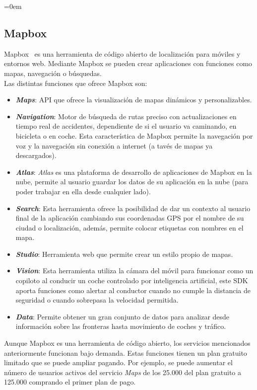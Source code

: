 \parindent=0em
\subsection{Mapbox}
\noindent

Mapbox~\cite{mapboxMainPage} es una herramienta de código abierto de localización para móviles y entornos web. Mediante Mapbox se pueden crear aplicaciones con funciones como mapas, navegación o búsquedas.\\

Las distintas funciones que ofrece Mapbox son:

\begin{itemize}
    \item \textit{\textbf{Maps}}: API que ofrece la visualización de mapas dinámicos y personalizables.
    
    \item \textit{\textbf{Navigation}}: Motor de búsqueda de rutas preciso con actualizaciones en tiempo real de accidentes, dependiente de si el usuario va caminando, en bicicleta o en coche. Esta característica de Mapbox permite la navegación por voz y la navegación sin conexión a internet (a tavés de mapas ya descargados).

    \item \textit{\textbf{Atlas}}: \textit{Atlas} es una plataforma de desarrollo de aplicaciones de Mapbox en la nube, permite al usuario guardar los datos de su aplicación en la nube (para poder trabajar en ella desde cualquier lado).
    
    \item \textit{\textbf{Search}}: Esta herramienta ofrece la posibilidad de dar un contexto al usuario final de la aplicación cambiando sus coordenadas GPS por el nombre de su ciudad o localización, además, permite colocar etiquetas con nombres en el mapa.
    
    \item \textit{\textbf{Studio}}: Herramienta web que permite crear un estilo propio de mapas.
    
    \item \textit{\textbf{Vision}}: Esta herramienta utiliza la cámara del móvil para funcionar como un copiloto al conducir un coche controlado por inteligencia artificial, este SDK aporta funciones como alertar al conductor cuando no cumple la distancia de seguridad o cuando sobrepasa la velocidad permitida.
    
    \item \textit{\textbf{Data}}: Permite obtener un gran conjunto de datos para analizar desde información sobre las fronteras hasta movimiento de coches y tráfico.
\end{itemize}

Aunque Mapbox es una herramienta de código abierto, los servicios mencionados anteriormente funcionan bajo demanda. Estas funciones tienen un plan gratuito limitado que se puede ampliar pagando. Por ejemplo, se puede aumentar el número de usuarios activos del servicio \textit{Maps} de los 25.000 del plan gratuito a 125.000 comprando el primer plan de pago.